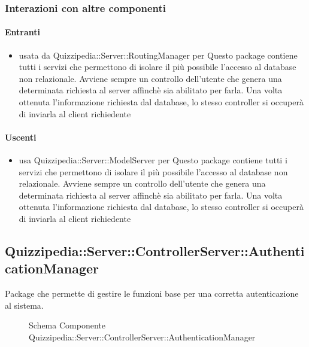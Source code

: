 \subsubsection{Interazioni con altre componenti}
\paragraph{Entranti}
\begin{itemize}
\item usata da Quizzipedia::Server::RoutingManager per Questo package contiene tutti i servizi che permettono di isolare il più possibile l'accesso al database non relazionale. Avviene sempre un controllo dell'utente che genera una determinata richiesta al server affinchè sia abilitato per farla. 
Una volta ottenuta l'informazione richiesta dal database, lo stesso controller si occuperà di inviarla al client richiedente
\end{itemize}
\paragraph{Uscenti}
\begin{itemize}
\item usa Quizzipedia::Server::ModelServer per Questo package contiene tutti i servizi che permettono di isolare il più possibile l'accesso al database non relazionale. Avviene sempre un controllo dell'utente che genera una determinata richiesta al server affinchè sia abilitato per farla. 
Una volta ottenuta l'informazione richiesta dal database, lo stesso controller si occuperà di inviarla al client richiedente
\end{itemize}
\subsection{Quizzipedia::Server::ControllerServer::AuthenticationManager}
Package che permette di gestire le funzioni base per una corretta autenticazione al sistema.
\begin{figure}[H]
\centering
\noindent{}
\caption[Schema Componente Quizzipedia::Server::ControllerServer::AuthenticationManager]{Schema Componente Quizzipedia::Server::ControllerServer::AuthenticationManager}
\end{figure}
